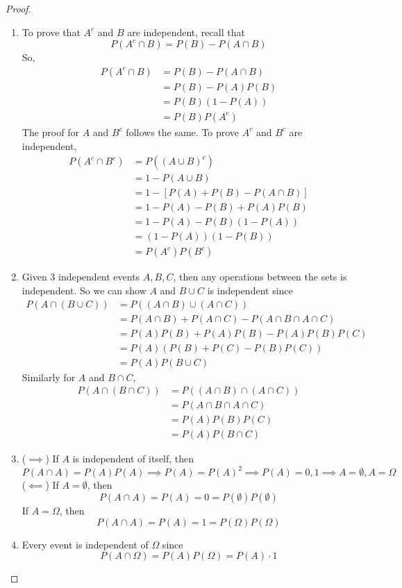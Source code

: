 \begin{proof}
    \begin{enumerate}
        \item To prove that $A^c$ and $B$ are independent, recall that
        \[P(A^c \cap B) = P(B) - P(A \cap B)\]
        So, 
        \begin{align*}
            P(A^c \cap B) &= P(B) - P(A \cap B)\\
            &= P(B) - P(A)P(B)\\
            &= P(B)(1 - P(A))\\
            &=P(B)P(A^c)
        \end{align*}
        The proof for $A$ and $B^c$ follows the same. To prove $A^c$ and $B^c$ are independent, 
        \begin{align*}
            P(A^c \cap B^c) &= P((A\cup B)^c)\\
            &= 1 - P(A\cup B)\\
            &= 1 - [P(A) + P(B) - P(A\cap B)]\\
            &= 1 - P(A) - P(B) + P(A)P(B)\\
            &= 1 - P(A) - P(B)(1 - P(A))\\
            &= (1-P(A))(1-P(B))\\
            &= P(A^c)P(B^c)
        \end{align*}
        \item Given 3 independent events $A,B,C$, then any operations between the sets is independent. So we can show $A$ and $B \cup C$ is independent since 
        \begin{align*}
            P(A \cap (B \cup C)) &= P((A \cap B) \cup (A \cap C)) \\
            &= P(A \cap B) + P(A \cap C) - P(A \cap B \cap A \cap C)\\
            &= P(A)P(B) + P(A)P(B) - P(A)P(B)P(C)\\
            &= P(A)(P(B) + P(C) - P(B)P(C))\\
            &= P(A)P(B \cup C)
        \end{align*}
        Similarly for $A$ and $B \cap C$, 
        \begin{align*}
            P(A \cap (B \cap C)) &= P((A \cap B) \cap (A \cap C)) \\
            &= P(A \cap B \cap A \cap C)\\
            &= P(A)P(B)P(C)\\
            &= P(A)P(B \cap C)
        \end{align*}
        \item ($\implies$) If $A$ is independent of itself, then 
        \[P(A \cap A) = P(A)P(A) \implies P(A) = P(A)^2 \implies P(A) =0, 1 \implies A = \emptyset, A = \Omega\]
        ($\impliedby$) If $A = \emptyset$, then 
        \[P(A \cap A) = P(A) = 0 = P(\emptyset)P(\emptyset)\]
        If $A = \Omega$, then
        \[P(A \cap A) = P(A) = 1 = P(\Omega)P(\Omega)\]
        \item Every event is independent of $\Omega$ since
        \[P(A \cap \Omega) = P(A)P(\Omega) = P(A) \cdot 1\]
    \end{enumerate}
    
\end{proof}
